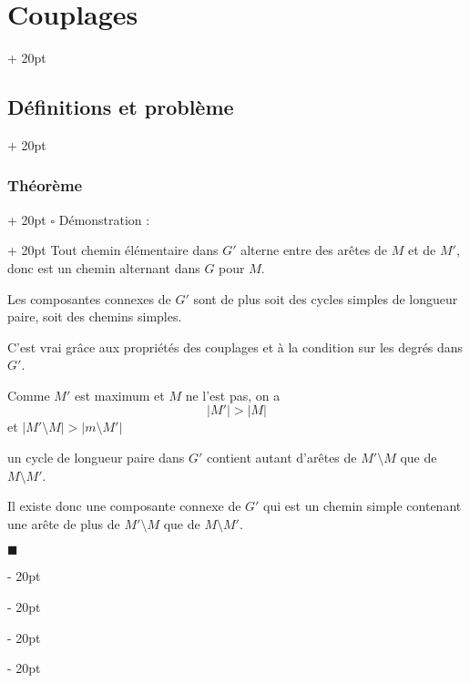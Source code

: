 \documentclass[a4paper, 12pt, twoside]{article}
\newcommand{\abs}[1]{\left\lvert #1 \right\rvert}
\newcommand{\ind}[1][20pt]{\advance\leftskip + #1}
\newcommand{\deind}[1][20pt]{\advance\leftskip - #1}
\newenvironment{indt}[2][20pt]{#2 \par \ind[#1]}{\par \deind} %
\newenvironment{proof}[1][{Démonstration :}]{\begin{indt}{$\square$ #1}}{$\blacksquare$ \end{indt}}
\begin{document}
\begin{indt}{\section{Couplages}}
\begin{indt}{\subsection{Définitions et problème}}
\begin{indt}{\subsubsection{Théorème}}
\begin{proof}
                    Tout chemin élémentaire dans $G'$ alterne entre des arêtes de $M$ et de $M'$, donc est un chemin alternant dans $G$ pour $M$.

                    Les composantes connexes de $G'$ sont de plus soit des cycles simples de longueur paire, soit des chemins simples.

                    \begin{center}
                    \end{center}

                    C'est vrai grâce aux propriétés des couplages et à la condition sur les degrés dans $G'$.

                    Comme $M'$ est maximum et $M$ ne l'est pas, on a
                    \[
                        \abs{M'} > \abs M
                    \]
                    et $\abs{M' \setminus M} > \abs{m \setminus M'}$

                    un cycle de longueur paire dans $G'$ contient autant d'arêtes de $M' \setminus M$ que de $M \setminus M'$.

                    \vspace{6pt}
                    
                    Il existe donc une composante connexe de $G'$ qui est un chemin simple contenant une arête de plus de $M'\setminus M$ que de $M \setminus M'$.


\end{proof}
\end{indt}
\end{indt}
\end{indt}
\end{document}
